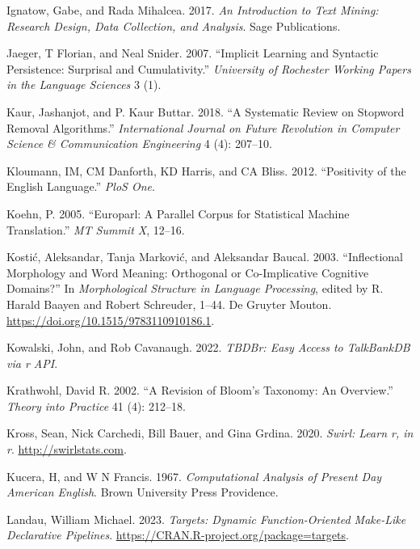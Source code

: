 \documentclass[
  letterpaper,
  DIV=11,
  numbers=noendperiod]{scrreport}
\newlength{\cslhangindent}
\newlength{\cslentryspacingunit} %
\newenvironment{CSLReferences}[2] %
 {%
  \setlength{\parindent}{0pt}
  \ifodd #1
  \let\oldpar\par
  \def\par{\hangindent=\cslhangindent\oldpar}
  \fi
  \setlength{\parskip}{#2\cslentryspacingunit}
 }%
 {}
\theoremstyle{definition}
\theoremstyle{remark}
\begin{document}
\begin{CSLReferences}{1}{0}
\leavevmode{}%
Ignatow, Gabe, and Rada Mihalcea. 2017. \emph{An Introduction to Text
Mining: Research Design, Data Collection, and Analysis}. Sage
Publications.

\leavevmode{}%
Jaeger, T Florian, and Neal Snider. 2007. {``Implicit Learning and
Syntactic Persistence: Surprisal and Cumulativity.''} \emph{University
of Rochester Working Papers in the Language Sciences} 3 (1).

\leavevmode{}%
Kaur, Jashanjot, and P. Kaur Buttar. 2018. {``A Systematic Review on
Stopword Removal Algorithms.''} \emph{International Journal on Future
Revolution in Computer Science \& Communication Engineering} 4 (4):
207--10.

\leavevmode{}%
Kloumann, IM, CM Danforth, KD Harris, and CA Bliss. 2012. {``Positivity
of the English Language.''} \emph{PloS One}.

\leavevmode{}%
Koehn, P. 2005. {``Europarl: A Parallel Corpus for Statistical Machine
Translation.''} \emph{MT Summit X}, 12--16.

\leavevmode{}%
Kostić, Aleksandar, Tanja Marković, and Aleksandar Baucal. 2003.
{``Inflectional Morphology and Word Meaning: Orthogonal or
Co-Implicative Cognitive Domains?''} In \emph{Morphological Structure in
Language Processing}, edited by R. Harald Baayen and Robert Schreuder,
1--44. De Gruyter Mouton. \url{https://doi.org/10.1515/9783110910186.1}.

\leavevmode{}%
Kowalski, John, and Rob Cavanaugh. 2022. \emph{TBDBr: Easy Access to
TalkBankDB via r API}.

\leavevmode{}%
Krathwohl, David R. 2002. {``A Revision of Bloom's Taxonomy: An
Overview.''} \emph{Theory into Practice} 41 (4): 212--18.

\leavevmode{}%
Kross, Sean, Nick Carchedi, Bill Bauer, and Gina Grdina. 2020.
\emph{Swirl: Learn r, in r}. \url{http://swirlstats.com}.

\leavevmode{}%
Kucera, H, and W N Francis. 1967. \emph{Computational Analysis of
Present Day American English}. Brown University Press Providence.

\leavevmode{}%
Landau, William Michael. 2023. \emph{Targets: Dynamic Function-Oriented
Make-Like Declarative Pipelines}.
\url{https://CRAN.R-project.org/package=targets}.


\end{CSLReferences}
\end{document}
